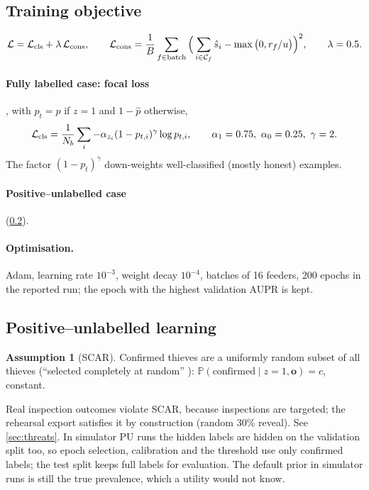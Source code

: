 \documentclass[11pt,a4paper]{article}
\theoremstyle{plain}
\theoremstyle{definition}
\newtheorem{assumption}{Assumption}
\theoremstyle{remark}
\newcommand{\Prob}{\mathbb{P}}
\begin{document}
\subsection{Training objective}
\begin{equation}
\mathcal L=\mathcal L_{\rm cls}+\lambda\,\mathcal L_{\rm cons},\qquad
\mathcal L_{\rm cons}=\frac1B\sum_{f\in\text{batch}}\Big(\sum_{i\in\mathcal C_f}\hat s_i-\max\big(0,r_f/u\big)\Big)^2,\qquad \lambda=0.5 .
\label{eq:loss}
\end{equation}

\paragraph{Fully labelled case: focal loss} \citep{lin2017focal}, with $p_t=\hat p$ if $z=1$ and $1-\hat p$ otherwise,
\begin{equation}
\mathcal L_{\rm cls}=\frac1{N_b}\sum_i-\alpha_{z_i}(1-p_{t,i})^{\gamma}\log p_{t,i},\qquad \alpha_1=0.75,\ \alpha_0=0.25,\ \gamma=2 .
\end{equation}
The factor $(1-p_t)^\gamma$ down-weights well-classified (mostly honest) examples.

\paragraph{Positive--unlabelled case} (\cref{sec:pu}).

\paragraph{Optimisation.} Adam, learning rate $10^{-3}$, weight decay $10^{-4}$, batches of 16 feeders, 200 epochs in the reported run; the epoch with the highest validation AUPR is kept.

\subsection{Positive--unlabelled learning}
\label{sec:pu}
\begin{assumption}[SCAR]
\label{as:scar}
Confirmed thieves are a uniformly random subset of all thieves (``selected completely at random'' \citep{elkan2008,bekker2020}): $\Prob(\text{confirmed}\mid z=1,\bm o)=c$, constant.
\end{assumption}
Real inspection outcomes violate SCAR, because inspections are targeted; the rehearsal export satisfies it by construction (random 30\% reveal). See \cref{sec:threats}. In simulator PU runs the hidden labels are hidden on the validation split too, so epoch selection, calibration and the threshold use only confirmed labels; the test split keeps full labels for evaluation. The default prior in simulator runs is still the true prevalence, which a utility would not know.
\end{document}
